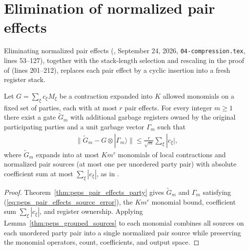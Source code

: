 \section{Elimination of normalized pair effects}
\label{sec:peps_pair_effects}
Eliminating normalized pair effects
(\cite[Lemma~5.1]{OpenAI2026PolynomialPEPS}, September 24, 2026,
\texttt{04-compression.tex}, lines 53--127), together with the stack-length
selection and rescaling in the proof of
\cite[Theorem~5.2]{OpenAI2026PolynomialPEPS} (lines 201--212), replaces each
pair effect by a cyclic insertion into a fresh register stack.

\begin{lemma}
    \label{lem:peps_pair_effects_source}
    \leanok
    Let $G=\sum_\xi c_\xi M_\xi$ be a contraction expanded into $K$ allowed
    monomials on a fixed set of parties, each with at most $r$ pair effects.
    For every integer $m\ge1$ there exist a gate $\widetilde G_m$ with
    additional garbage registers owned by the original participating parties
    and a unit garbage vector $\Gamma_m$ such that
    \begin{align}
        \bigl\|\widetilde G_m-G\otimes|\Gamma_m\rangle\bigr\|
        \le\frac r{\sqrt m}\sum_\xi|c_\xi|,
        \label{eq:peps_pair_effects_source_error}
    \end{align}
    where $\widetilde G_m$ expands into at most $Km^r$ monomials of local
    contractions and normalized pair sources (at most one per unordered party
    pair) with absolute coefficient sum at most $\sum_\xi|c_\xi|$, as in
    \cite[Lemma~5.1]{OpenAI2026PolynomialPEPS}.
\end{lemma}

\begin{proof}\leanok
    Theorem~\ref{thm:peps_pair_effects_party} gives $\widetilde G_m$ and
    $\Gamma_m$ satisfying (\ref{eq:peps_pair_effects_source_error}), the
    $Km^r$ monomial bound, coefficient sum $\sum_\xi|c_\xi|$, and register
    ownership. Applying Lemma~\ref{thm:peps_grouped_sources} to each monomial
    combines all sources on each unordered party pair into a single normalized
    pair source while preserving the monomial operators, count, coefficients,
    and output space.
\end{proof}

